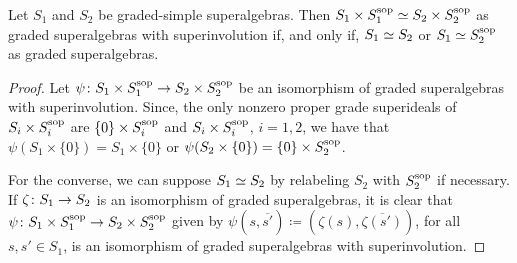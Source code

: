 



\begin{lemma}\label{lemma:iso-SxSsop}
    Let $S_1$ and $S_2$ be graded-simple superalgebras. 
    Then $S_1\times S_1^{\mathrm{sop}} \simeq S_2\times S_2^{\mathrm{sop}}$ as graded superalgebras with superinvolution if, and only if, $S_1 \simeq S_2$ or $S_1 \simeq S_2^{\mathrm{sop}}$ as graded superalgebras.
\end{lemma}

\begin{proof}
    Let $\psi\colon S_1\times S_1^{\mathrm{sop}} \to S_2\times S_2^{\mathrm{sop}}$ be an isomorphism of graded superalgebras with superinvolution. 
    Since, the only nonzero proper grade superideals of $S_i \times S_i^{\mathrm{sop}}$ are $\{ 0 \} \times S_i^{\mathrm{sop}}$ and $S_i\times S_i^{\mathrm{sop}}$, $i = 1,2$, we have that $\psi(S_1\times \{ 0 \}) = S_1\times \{ 0 \}$ or $\psi(S_2\times \{ 0 \}) = \{ 0 \} \times S_2^{\mathrm{sop}}$.  
    
    For the converse, we can suppose $S_1 \simeq S_2$ by relabeling $S_2$ with $S_2^{\mathrm{sop}}$ if necessary.
    If $\zeta \colon S_1 \to S_2$ is an isomorphism of graded superalgebras, it is clear that $\psi\colon S_1\times S_1^{\mathrm{sop}} \to S_2\times S_2^{\mathrm{sop}}$ given by $\psi (s, \overline{s'}) \coloneqq (\zeta(s), \overline{\zeta(s')})$, for all $s,s' \in S_1$, is an isomorphism of graded superalgebras with superinvolution.
\end{proof}

